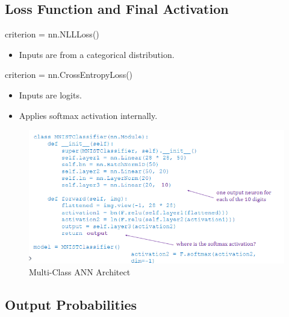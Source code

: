 \documentclass[11pt, english]{article}
\begin{document}
\subsection{Loss Function and Final Activation}
criterion = nn.NLLLoss()
\begin{itemize}
    \item Inputs are from a categorical distribution.
\end{itemize}
criterion = nn.CrossEntropyLoss()
\begin{itemize}
    \item Inputs are logits.
    \item Applies softmax activation internally.
\end{itemize}
\begin{figure}
    \centering
    \includegraphics[width=0.75\linewidth]{multiclass.png}
    \caption{Multi-Class ANN Architect}
    \label{fig:enter-label}
\end{figure}
\subsection{Output Probabilities}
\end{document}
